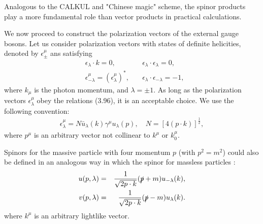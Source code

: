 Analogous to the CALKUL and "Chinese magic" scheme, the spinor products play a more fundamental role than vector products in practical calculations.

We now proceed to construct the polarization vectors of the external gauge bosons. Let us consider polarization vectors with states of definite helicities, denoted by $\epsilon_\pm^\mu$ ans satisfying
\begin{eqnarray}
&\epsilon_\lambda\cdot k=0,\quad &\epsilon_\lambda\cdot\epsilon_\lambda=0,\nonumber\\
&\epsilon_{-\lambda}^\mu=(\epsilon_\lambda^\mu)^\ast,\quad
&\epsilon_\lambda\cdot\epsilon_{-\lambda}=-1,
\end{eqnarray}
where $k_\mu$ is the photon momentum, and $\lambda=\pm1$. As long as the polarization vectors $\epsilon_\lambda^\mu$ obey the relations (3.96), it is an acceptable choice. We use the following convention:
\begin{eqnarray}
\epsilon_\lambda^\mu=N\bar{u}_\lambda(k)\gamma^\mu u_\lambda(p),\quad N=[4(p\cdot k)]^\frac{1}{2},
\end{eqnarray} 
where $p^\mu$ is an arbitrary vector not collinear to $k^\mu$ or $k_0^\mu$. 

Spinors for the massive particle with four momentum $p$ (with $p^2=m^2$) could also be defined in an analogous way in which the spinor for massless particles \cite{GPS}: 
\begin{eqnarray}
u(p,\lambda)&=&\frac{1}{\sqrt{2p\cdot k}}(\slashed p+m)u_{-\lambda}(k),\nonumber\\
v(p,\lambda)&=&\frac{1}{\sqrt{2p\cdot k}}(\slashed p-m)u_\lambda(k).
\end{eqnarray}
where $k^\mu$ is an arbitrary lightlike vector.

